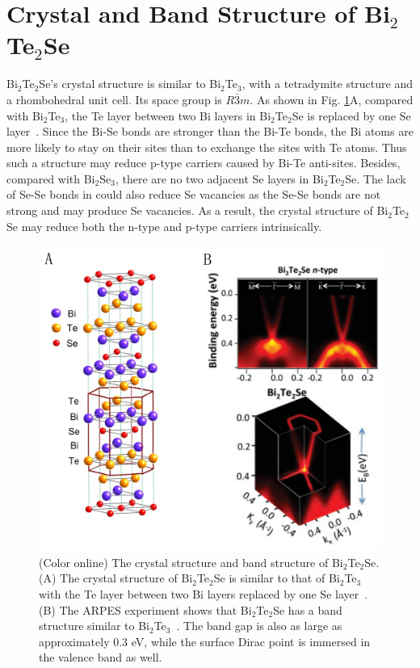 \section{Crystal and Band Structure of Bi$_2$Te$_2$Se}
\label{sec:bts:bts-band}

Bi$_2$Te$_2$Se's crystal structure is similar to Bi$_2$Te$_3$, with a tetradymite structure and a rhombohedral unit cell. Its space group is $R\bar{3}m$. As shown in Fig. \ref{BTS_structure}A, compared with Bi$_2$Te$_3$, the Te layer between two Bi layers in Bi$_2$Te$_2$Se is replaced by one Se layer~\cite{Ando10}. Since the Bi-Se bonds are stronger than the Bi-Te bonds, the Bi atoms are more likely to stay on their sites than to exchange the sites with Te atoms. Thus such a structure may reduce p-type carriers caused by Bi-Te anti-sites. Besides, compared with Bi$_2$Se$_3$, there are no two adjacent Se layers in Bi$_2$Te$_2$Se. The lack of Se-Se bonds in could also reduce Se vacancies as the Se-Se bonds are not strong and may produce Se vacancies. As a result, the crystal structure of Bi$_2$Te$_2$Se may reduce both the n-type and p-type carriers intrinsically. 

\begin{figure}[!htbp]
  \begin{center}            
\includegraphics[width=0.9\linewidth]{ch-bts/figures/BTS_structure.pdf} 
\caption{\label{BTS_structure} (Color online) 
The crystal structure and band structure of Bi$_2$Te$_2$Se. (A) The crystal structure of Bi$_2$Te$_2$Se is similar to that of Bi$_2$Te$_3$ with the Te layer between two Bi layers replaced by one Se layer~\cite{Ando10}. (B) The ARPES experiment shows that Bi$_2$Te$_2$Se has a band structure similar to Bi$_2$Te$_3$~\cite{BTS_ARPES}. The band gap is also as large as approximately 0.3 eV, while the surface Dirac point is immersed in the valence band as well.
} 
  \end{center}
\end{figure}

